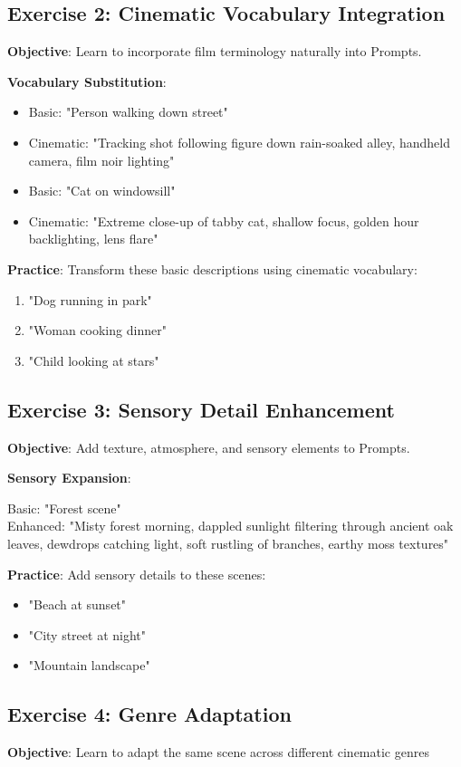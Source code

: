 \subsection*{Exercise 2: Cinematic Vocabulary Integration}
\textbf{Objective}: Learn to incorporate film terminology naturally into Prompts.

\textbf{Vocabulary Substitution}:
\begin{itemize}
\item Basic: "Person walking down street" 
\item Cinematic: "Tracking shot following figure down rain-soaked alley, handheld camera, film noir lighting"
\item Basic: "Cat on windowsill"
\item Cinematic: "Extreme close-up of tabby cat, shallow focus, golden hour backlighting, lens flare"
\end{itemize}

\textbf{Practice}: Transform these basic descriptions using cinematic vocabulary:
\begin{enumerate}
\item "Dog running in park"
\item "Woman cooking dinner"
\item "Child looking at stars"
\end{enumerate}

\subsection*{Exercise 3: Sensory Detail Enhancement}
\textbf{Objective}: Add texture, atmosphere, and sensory elements to Prompts.

\textbf{Sensory Expansion}:
\begin{Prompt}
Basic: "Forest scene"\\
Enhanced: "Misty forest morning, dappled sunlight filtering through ancient oak leaves, dewdrops catching light, soft rustling of branches, earthy moss textures"
\end{Prompt}

\textbf{Practice}: Add sensory details to these scenes:
\begin{itemize}
\item "Beach at sunset"
\item "City street at night"
\item "Mountain landscape"
\end{itemize}

\subsection*{Exercise 4: Genre Adaptation}
\textbf{Objective}: Learn to adapt the same scene across different cinematic genres

